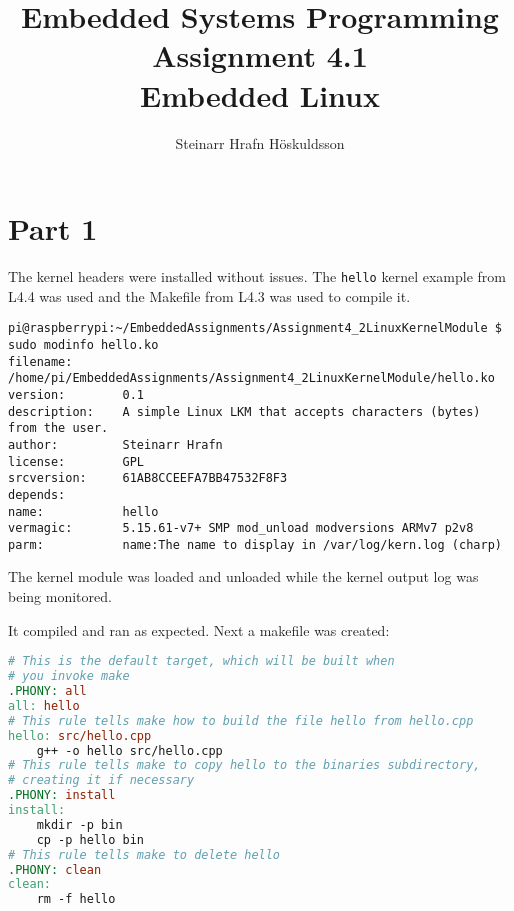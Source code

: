 \documentclass{article}
\title{Embedded Systems Programming \\ Assignment 4.1 \\ \large Embedded Linux}
\author{Steinarr Hrafn Höskuldsson}
\newcommand{\mycomment}[1]{}
\begin{document}
\pagestyle{firststyle}
{\let\newpage\relax\maketitle}

\mycomment{
\begin{figure}[h]
    \centering
    \texttt{[image: LAB3/Basic1.png]}
    \caption{"Switch test" Breadboard set up}
    \label{fig:Switch_test}
\end{figure}



}

\section*{Part 1}
The kernel headers were installed without issues. The \verb!hello! kernel example from L4.4 was used and the Makefile from L4.3 was used to compile it.

\begin{lstlisting}[caption={The output of modinfo}]
pi@raspberrypi:~/EmbeddedAssignments/Assignment4_2LinuxKernelModule $ sudo modinfo hello.ko
filename:       /home/pi/EmbeddedAssignments/Assignment4_2LinuxKernelModule/hello.ko
version:        0.1
description:    A simple Linux LKM that accepts characters (bytes) from the user.
author:         Steinarr Hrafn
license:        GPL
srcversion:     61AB8CCEEFA7BB47532F8F3
depends:        
name:           hello
vermagic:       5.15.61-v7+ SMP mod_unload modversions ARMv7 p2v8 
parm:           name:The name to display in /var/log/kern.log (charp)
\end{lstlisting}

The kernel module was loaded and unloaded while the kernel output log was being monitored. 

It compiled and ran as expected. Next a makefile was created:

\begin{lstlisting}[language=makefile, caption={Makefile for simple hello program}]
# This is the default target, which will be built when 
# you invoke make
.PHONY: all
all: hello
# This rule tells make how to build the file hello from hello.cpp
hello: src/hello.cpp
	g++ -o hello src/hello.cpp
# This rule tells make to copy hello to the binaries subdirectory,
# creating it if necessary
.PHONY: install
install:
	mkdir -p bin
	cp -p hello bin
# This rule tells make to delete hello 
.PHONY: clean 
clean:
	rm -f hello

\end{lstlisting}
\newpage
\end{document}
